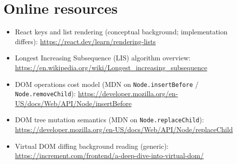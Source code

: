 \section{Online resources}
\begin{itemize}
  \item React keys and list rendering (conceptual background; implementation differs): \href{https://react.dev/learn/rendering-lists}{https://react.dev/learn/rendering-lists}
  \item Longest Increasing Subsequence (LIS) algorithm overview: \href{https://en.wikipedia.org/wiki/Longest\_increasing\_subsequence}{https://en.wikipedia.org/wiki/Longest\_increasing\_subsequence}
  \item DOM operations cost model (MDN on \texttt{Node.insertBefore} / \texttt{Node.removeChild}): \href{https://developer.mozilla.org/en-US/docs/Web/API/Node/insertBefore}{https://developer.mozilla.org/en-US/docs/Web/API/Node/insertBefore}
  \item DOM tree mutation semantics (MDN on \texttt{Node.replaceChild}): \href{https://developer.mozilla.org/en-US/docs/Web/API/Node/replaceChild}{https://developer.mozilla.org/en-US/docs/Web/API/Node/replaceChild}
  \item Virtual DOM diffing background reading (generic): \href{https://increment.com/frontend/a-deep-dive-into-virtual-dom/}{https://increment.com/frontend/a-deep-dive-into-virtual-dom/}
\end{itemize}
